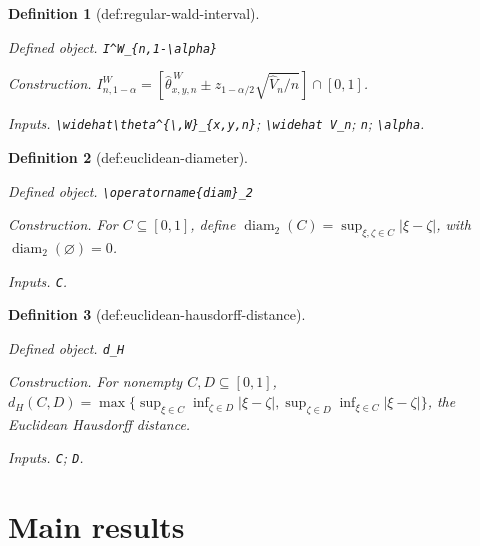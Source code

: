 \documentclass{article}
\newtheorem{definition}{Definition}
\begin{document}
\begin{definition}[def:regular-wald-interval]\label{def:regular-wald-interval}
\par\smallskip\noindent\emph{Defined object.} \texttt{I\textasciicircum{}W\_\allowbreak{}\{n,\allowbreak{}1-\allowbreak{}\textbackslash{}\allowbreak{}alpha\}\allowbreak{}}
\par\smallskip\noindent\emph{Construction.} \(I^W_{n,1-\alpha}=[\widehat\theta^{\,W}_{x,y,n}\pm z_{1-\alpha/2}\sqrt{\widehat V_n/n}]\cap[0,1]\).
\par\smallskip\noindent\emph{Inputs.} \texttt{\textbackslash{}\allowbreak{}widehat\textbackslash{}\allowbreak{}theta\textasciicircum{}\{\textbackslash{}\allowbreak{},\allowbreak{}W\}\allowbreak{}\_\allowbreak{}\{x,\allowbreak{}y,\allowbreak{}n\}\allowbreak{}}; \texttt{\textbackslash{}\allowbreak{}widehat V\_\allowbreak{}n}; \texttt{n}; \texttt{\textbackslash{}\allowbreak{}alpha}.
\end{definition}

\begin{definition}[def:euclidean-diameter]\label{def:euclidean-diameter}
\par\smallskip\noindent\emph{Defined object.} \texttt{\textbackslash{}\allowbreak{}operatorname\{diam\}\allowbreak{}\_\allowbreak{}2}
\par\smallskip\noindent\emph{Construction.} For \(C\subseteq[0,1]\), define \(\operatorname{diam}_2(C)=\sup_{\xi,\zeta\in C}|\xi-\zeta|\), with \(\operatorname{diam}_2(\varnothing)=0\).
\par\smallskip\noindent\emph{Inputs.} \texttt{C}.
\end{definition}

\begin{definition}[def:euclidean-hausdorff-distance]\label{def:euclidean-hausdorff-distance}
\par\smallskip\noindent\emph{Defined object.} \texttt{d\_\allowbreak{}H}
\par\smallskip\noindent\emph{Construction.} For nonempty \(C,D\subseteq[0,1]\), \(d_H(C,D)=\max\{\sup_{\xi\in C}\inf_{\zeta\in D}|\xi-\zeta|,\sup_{\zeta\in D}\inf_{\xi\in C}|\xi-\zeta|\}\), the Euclidean Hausdorff distance.
\par\smallskip\noindent\emph{Inputs.} \texttt{C}; \texttt{D}.
\end{definition}

\section{Main results}
\end{document}
